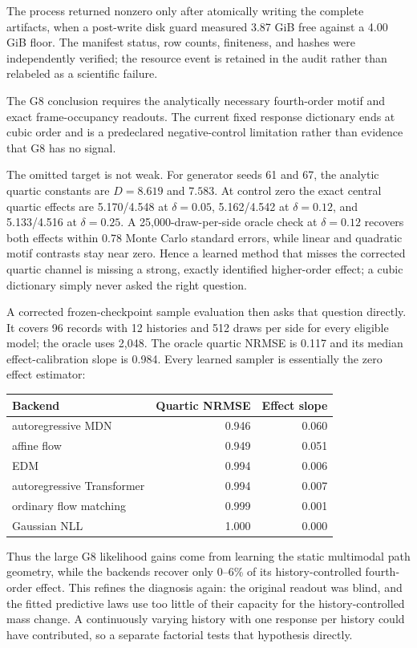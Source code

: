 The process returned nonzero only after atomically writing the complete artifacts,
when a post-write disk guard measured 3.87 GiB free against a 4.00 GiB floor.  The
manifest status, row counts, finiteness, and hashes were independently verified;
the resource event is retained in the audit rather than relabeled as a scientific
failure.

The G8 conclusion requires the analytically necessary fourth-order motif and exact
frame-occupancy readouts.  The current fixed response dictionary ends at cubic
order and is a predeclared negative-control limitation rather than evidence that
G8 has no signal.

The omitted target is not weak.  For generator seeds 61 and 67, the analytic
quartic constants are $D=8.619$ and $7.583$.  At control zero the exact central
quartic effects are 5.170/4.548 at $\delta=0.05$, 5.162/4.542 at
$\delta=0.12$, and 5.133/4.516 at $\delta=0.25$.  A 25,000-draw-per-side oracle
check at $\delta=0.12$ recovers both effects within 0.78 Monte Carlo standard
errors, while linear and quadratic motif contrasts stay near zero.  Hence a
learned method that misses the corrected quartic channel is missing a strong,
exactly identified higher-order effect; a cubic dictionary simply never asked the
right question.

A corrected frozen-checkpoint sample evaluation then asks that question directly.
It covers 96 records with 12 histories and 512 draws per side for every eligible
model; the oracle uses 2,048.  The oracle quartic NRMSE is 0.117 and its median
effect-calibration slope is 0.984.  Every learned sampler is essentially the zero
effect estimator:
\begin{center}
\begin{tabular}{@{}lrr@{}}
\toprule
Backend & Quartic NRMSE & Effect slope \\
\midrule
autoregressive MDN & 0.946 & 0.060 \\
affine flow & 0.949 & 0.051 \\
EDM & 0.994 & 0.006 \\
autoregressive Transformer & 0.994 & 0.007 \\
ordinary flow matching & 0.999 & 0.001 \\
Gaussian NLL & 1.000 & 0.000 \\
\bottomrule
\end{tabular}
\end{center}
Thus the large G8 likelihood gains come from learning the static multimodal path
geometry, while the backends recover only 0--6\% of its history-controlled
fourth-order effect.  This refines the diagnosis again: the original readout was
blind, and the fitted predictive laws use too little of their capacity for the
history-controlled mass change.  A continuously varying history with one response
per history could have contributed, so a separate factorial tests that hypothesis
directly.

